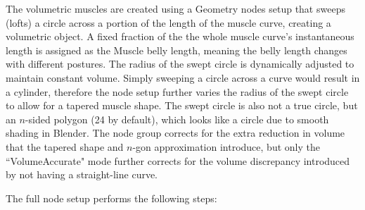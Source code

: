 \documentclass{article}
\begin{document}
The volumetric muscles are created using a Geometry nodes setup that sweeps (lofts) a circle across a portion of the length of the muscle curve, creating a volumetric object. A fixed fraction of the the whole muscle curve's instantaneous length is assigned as the Muscle belly length, meaning the belly length changes with different postures. The radius of the swept circle is dynamically adjusted to maintain constant volume. Simply sweeping a circle across a curve would result in a cylinder, therefore the node setup further varies the radius of the swept circle to allow for a tapered muscle shape. The swept circle is also not a true circle, but an $n$-sided polygon (24 by default), which looks like a circle due to smooth shading in Blender. The node group corrects for the extra reduction in volume that the tapered shape and $n$-gon approximation introduce, but only the ``VolumeAccurate" mode further corrects for the volume discrepancy introduced by not having a straight-line curve.

The full node setup performs the following steps:
\end{document}
